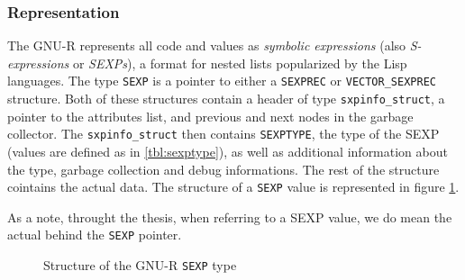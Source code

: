 \subsubsection*{Representation}

The GNU-R represents all code and values as \textit{symbolic expressions} (also \textit{S-expressions} or \textit{SEXPs}), a format for nested lists popularized by the Lisp languages. The type \texttt{SEXP} is a pointer to either a \texttt{SEXPREC} or \texttt{VECTOR\_SEXPREC} structure. Both of these structures contain a header of type \texttt{sxpinfo\_struct}, a pointer to the attributes list, and previous and next nodes in the garbage collector. The \texttt{sxpinfo\_struct} then contains \texttt{SEXPTYPE}, the type of the SEXP (values are defined as in \ref{tbl:sexptype}), as well as additional information about the type, garbage collection and debug informations. The rest of the structure cointains the actual data. The structure of a \texttt{SEXP} value is represented in figure \ref{fig:sexp-struct}.

As a note, throught the thesis, when referring to a SEXP value, we do mean the actual behind the \texttt{SEXP} pointer.

\begin{figure}
	\centering
	\begin{adjustbox}{trim=5pt 20pt 0 40pt, clip}
	\end{adjustbox}
	\caption{Structure of the GNU-R \texttt{SEXP} type}\label{fig:sexp-struct}
\end{figure}

